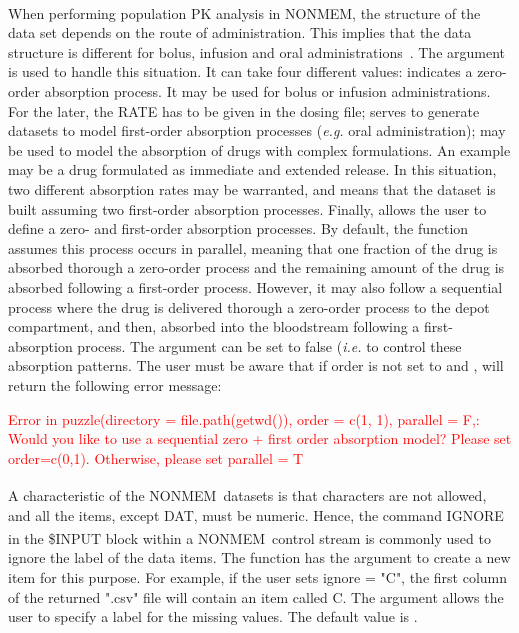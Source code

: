 When performing population PK analysis in NONMEM\textsuperscript{\textregistered}, the structure of the data set depends on the route of administration. This implies that the data structure is different for bolus, infusion and oral administrations~\citep{Owen2014}.  The argument  is used to handle this situation. It can take four different values:  indicates a zero-order absorption process. It may be used for bolus or infusion administrations. For the later, the RATE has to be given in the dosing file;  serves to generate datasets to model first-order absorption processes (\textit{e.g.} oral administration);  may be used to model the absorption of drugs with complex formulations. An example may be a drug formulated as immediate and extended release. In this situation, two different absorption rates may be warranted, and  means that the dataset is built assuming two first-order absorption processes. Finally,  allows the user to define a zero- and first-order absorption processes. By default, the  function assumes this process occurs in parallel, meaning that one fraction of the drug is absorbed thorough a zero-order process and the remaining amount of the drug is absorbed following a first-order process. However, it may also follow a sequential process where the drug is delivered thorough a zero-order process to the depot compartment, and then, absorbed into the bloodstream following a first-absorption process. The argument  can be set to false (\textit{i.e.}  to control these absorption patterns. The user must be aware that if order is not set to  and ,  will return the following error message: 


\textcolor{red}{
Error in puzzle(directory = file.path(getwd()), order = c(1, 1), parallel = F,: 
Would you like to use a sequential zero + first order absorption model? 
Please set order=c(0,1). Otherwise, please set parallel = T
}

A characteristic of the NONMEM\textsuperscript{\textregistered}~datasets is that characters are not allowed, and all the items, except DAT, must be numeric. Hence, the command IGNORE in the \$INPUT block within a NONMEM\textsuperscript{\textregistered}~control stream is commonly used to ignore the label of the data items. The  function has the argument  to create a new item for this purpose. For example, if the user sets ignore = "C", the first column of the returned ".csv" file will contain an item called C. The argument  allows the user to specify a label for the missing values. The default value is .

